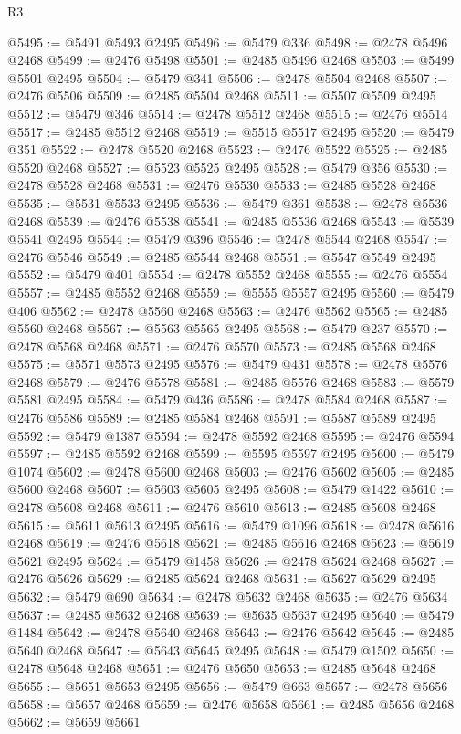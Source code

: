 \begin{lexlean}{R3}
\begin{coremodule}
@5495 := @5491 @5493 @2495
@5496 := @5479 @336
@5498 := @2478 @5496 @2468
@5499 := @2476 @5498
@5501 := @2485 @5496 @2468
@5503 := @5499 @5501 @2495
@5504 := @5479 @341
@5506 := @2478 @5504 @2468
@5507 := @2476 @5506
@5509 := @2485 @5504 @2468
@5511 := @5507 @5509 @2495
@5512 := @5479 @346
@5514 := @2478 @5512 @2468
@5515 := @2476 @5514
@5517 := @2485 @5512 @2468
@5519 := @5515 @5517 @2495
@5520 := @5479 @351
@5522 := @2478 @5520 @2468
@5523 := @2476 @5522
@5525 := @2485 @5520 @2468
@5527 := @5523 @5525 @2495
@5528 := @5479 @356
@5530 := @2478 @5528 @2468
@5531 := @2476 @5530
@5533 := @2485 @5528 @2468
@5535 := @5531 @5533 @2495
@5536 := @5479 @361
@5538 := @2478 @5536 @2468
@5539 := @2476 @5538
@5541 := @2485 @5536 @2468
@5543 := @5539 @5541 @2495
@5544 := @5479 @396
@5546 := @2478 @5544 @2468
@5547 := @2476 @5546
@5549 := @2485 @5544 @2468
@5551 := @5547 @5549 @2495
@5552 := @5479 @401
@5554 := @2478 @5552 @2468
@5555 := @2476 @5554
@5557 := @2485 @5552 @2468
@5559 := @5555 @5557 @2495
@5560 := @5479 @406
@5562 := @2478 @5560 @2468
@5563 := @2476 @5562
@5565 := @2485 @5560 @2468
@5567 := @5563 @5565 @2495
@5568 := @5479 @237
@5570 := @2478 @5568 @2468
@5571 := @2476 @5570
@5573 := @2485 @5568 @2468
@5575 := @5571 @5573 @2495
@5576 := @5479 @431
@5578 := @2478 @5576 @2468
@5579 := @2476 @5578
@5581 := @2485 @5576 @2468
@5583 := @5579 @5581 @2495
@5584 := @5479 @436
@5586 := @2478 @5584 @2468
@5587 := @2476 @5586
@5589 := @2485 @5584 @2468
@5591 := @5587 @5589 @2495
@5592 := @5479 @1387
@5594 := @2478 @5592 @2468
@5595 := @2476 @5594
@5597 := @2485 @5592 @2468
@5599 := @5595 @5597 @2495
@5600 := @5479 @1074
@5602 := @2478 @5600 @2468
@5603 := @2476 @5602
@5605 := @2485 @5600 @2468
@5607 := @5603 @5605 @2495
@5608 := @5479 @1422
@5610 := @2478 @5608 @2468
@5611 := @2476 @5610
@5613 := @2485 @5608 @2468
@5615 := @5611 @5613 @2495
@5616 := @5479 @1096
@5618 := @2478 @5616 @2468
@5619 := @2476 @5618
@5621 := @2485 @5616 @2468
@5623 := @5619 @5621 @2495
@5624 := @5479 @1458
@5626 := @2478 @5624 @2468
@5627 := @2476 @5626
@5629 := @2485 @5624 @2468
@5631 := @5627 @5629 @2495
@5632 := @5479 @690
@5634 := @2478 @5632 @2468
@5635 := @2476 @5634
@5637 := @2485 @5632 @2468
@5639 := @5635 @5637 @2495
@5640 := @5479 @1484
@5642 := @2478 @5640 @2468
@5643 := @2476 @5642
@5645 := @2485 @5640 @2468
@5647 := @5643 @5645 @2495
@5648 := @5479 @1502
@5650 := @2478 @5648 @2468
@5651 := @2476 @5650
@5653 := @2485 @5648 @2468
@5655 := @5651 @5653 @2495
@5656 := @5479 @663
@5657 := @2478 @5656
@5658 := @5657 @2468
@5659 := @2476 @5658
@5661 := @2485 @5656 @2468
@5662 := @5659 @5661

\end{coremodule}
\end{lexlean}
